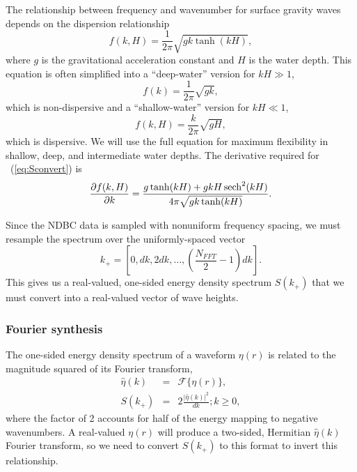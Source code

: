 The relationship between frequency and wavenumber for surface gravity waves depends on the dispersion relationship\cite{Hodges}
\begin{equation}
f(k,H) = \frac{1}{2\pi}\sqrt{gk\tanh(kH)},\label{eq:Dispersion}
\end{equation}
where $g$ is the gravitational acceleration constant and $H$ is the water depth. This equation is often simplified into a ``deep-water'' version for $kH\gg 1$,
\begin{equation}
f(k) = \frac{1}{2\pi}\sqrt{gk},
\end{equation}
which is non-dispersive and a ``shallow-water'' version for $kH\ll 1$, 
\begin{equation}
f(k,H) = \frac{k}{2\pi}\sqrt{gH},
\end{equation}
which is dispersive. We will use the full equation for maximum flexibility in shallow, deep, and intermediate water depths. The derivative required for \eqnname~(\ref{eq:Sconvert}) is
\begin{equation}
\frac{\partial f(k,H)}{\partial k} = \frac{g\tanh(kH) + gkH\operatorname{sech}^2(kH)}{4\pi\sqrt{gk\tanh(kH)}}.
\end{equation}

Since the NDBC data is sampled with nonuniform frequency spacing, we must resample the spectrum over the uniformly-spaced vector
\begin{equation}
k_+ = \left[0, dk, 2dk, \ldots, \left(\frac{N_{FFT}}{2}-1\right)dk\right].
\end{equation}
This gives us a real-valued, one-sided energy density spectrum $S(k_+)$ that we must convert into a real-valued vector of wave heights.

\subsubsection{Fourier synthesis}

The one-sided energy density spectrum of a waveform $\eta(r)$ is related to the magnitude squared of its Fourier transform,
\begin{eqnarray}
\hat{\eta}(k) & = & \mathcal{F}\{\eta(r)\}, \\
S(k_+) & = & 2\frac{\vert\hat{\eta}(k)\vert^2}{dk}; k\geq 0,
\end{eqnarray}
where the factor of 2 accounts for half of the energy mapping to negative wavenumbers. A real-valued $\eta(r)$ will produce a two-sided, Hermitian $\hat{\eta}(k)$ Fourier transform, so we need to convert $S(k_+)$ to this format to invert this relationship. 

